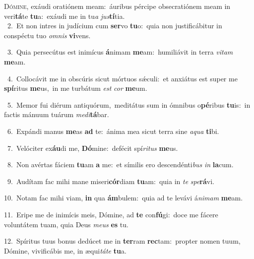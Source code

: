 \lettrine{\initial\textcolor{\initialcolor}{D}}{ómine,} exáudi oratiónem meam:~\dagger áuribus pércipe obsecratiónem meam in veri\-\textbf{tá}\-te \textbf{tu}\-a:~\star exáudi me in tu\textit{a} \textit{jus}\-\textbf{tí}tia.\\
{\numbfont\textcolor{\numbcolor}{~2.}}~Et non intres in judícium cum \textbf{ser}\-vo \textbf{tu}\-o:~\star quia non justificábitur in conspéctu tuo \textit{om}\-\textit{nis} \textbf{vi}\-vens.\par
{\numbfont\textcolor{\numbcolor}{~3.}}~Quia persecútus est inimícus \textbf{á}\-nimam \textbf{me}\-am:~\star humiliávit in terra \textit{vi}\-\textit{tam} \textbf{me}\-am.\par
{\numbfont\textcolor{\numbcolor}{~4.}}~Collocávit me in obscúris sicut mórtuos sǽculi:~\dagger et anxiátus est super me \textbf{spí}\-ritus \textbf{me}\-us,~\star in me turbátum \textit{est} \textit{cor} \textbf{me}\-um.\par
{\numbfont\textcolor{\numbcolor}{~5.}}~Memor fui diérum antiquórum,~\dagger meditátus sum in ómnibus o\-\textbf{pé}\-ribus \textbf{tu}\-is:~\star in factis mánuum tuárum \textit{me}\-\textit{di}\textbf{tá}bar.\par
{\numbfont\textcolor{\numbcolor}{~6.}}~Expándi manus \textbf{me}\-as \textbf{ad} te:~\star ánima mea sicut terra sine \textit{a}\-\textit{qua} \textbf{ti}\-bi.\par
{\numbfont\textcolor{\numbcolor}{~7.}}~Velóciter ex\-\textbf{áu}\-di me, \textbf{Dó}\-mine:~\star defécit spí\-\textit{ri}\-\textit{tus} \textbf{me}\-us.\par
{\numbfont\textcolor{\numbcolor}{~8.}}~Non avértas fáciem \textbf{tu}\-am \textbf{a} me:~\star et símilis ero descendénti\textit{bus} \textit{in} \textbf{la}\-cum.\par
{\numbfont\textcolor{\numbcolor}{~9.}}~Audítam fac mihi mane miseri\-\textbf{cór}\-diam \textbf{tu}\-am:~\star quia in \textit{te} \textit{spe}\-\textbf{rá}vi.\par
{\numbfont\textcolor{\numbcolor}{10.}}~Notam fac mihi viam, \textbf{in} qua \textbf{ám}\-bulem:~\star quia ad te levávi á\-\textit{ni}\-\textit{mam} \textbf{me}\-am.\par
{\numbfont\textcolor{\numbcolor}{11.}}~Eripe me de inimícis meis, Dómine, ad \textbf{te} con\-\textbf{fú}\-gi:~\star doce me fácere voluntátem tuam, quia Deus \textit{me}\-\textit{us} \textbf{es} tu.\par
{\numbfont\textcolor{\numbcolor}{12.}}~Spíritus tuus bonus dedúcet me in \textbf{ter}\-ram \textbf{rec}\-tam:~\star propter nomen tuum, Dómine, vivificábis me, in æqui\-\textit{tá}\-\textit{te} \textbf{tu}\-a.\par
